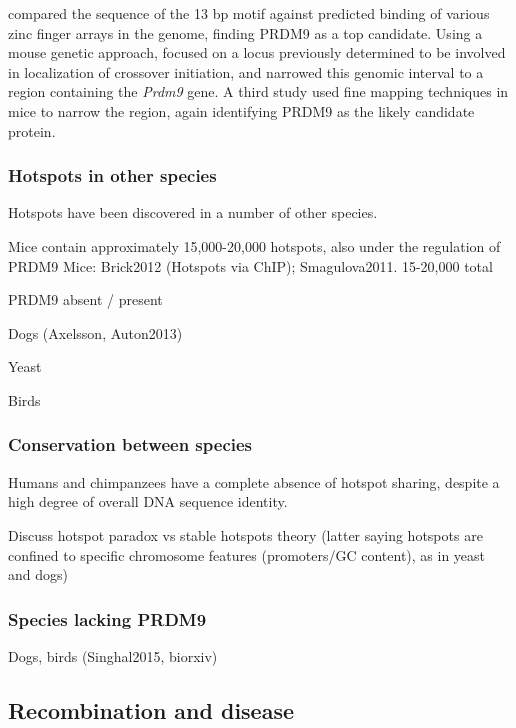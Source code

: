 \citet{Myers2010} compared the sequence of the 13 bp motif against predicted binding of various zinc finger arrays in the genome, finding PRDM9 as a top candidate.
Using a mouse genetic approach, \citet{Baudat2010} focused on a locus previously determined to be involved in localization of crossover initiation\cite{Grey2009,Parvanov2009},
and narrowed this genomic interval to a region containing the \textit{Prdm9} gene.
A third study used fine mapping techniques in mice to narrow the region, again identifying PRDM9 as the likely candidate protein\cite{Parvanov2010}.



\subsubsection{Hotspots in other species}

Hotspots have been discovered in a number of other species.

Mice contain approximately 15,000-20,000 hotspots, also under the regulation of PRDM9
Mice: Brick2012 (Hotspots via ChIP); Smagulova2011. 15-20,000 total

PRDM9 absent / present

Dogs (Axelsson, Auton2013)

Yeast

Birds


\subsubsection{Conservation between species}
Humans and chimpanzees have a complete absence of hotspot sharing, despite a high degree of overall DNA sequence identity\cite{Ptak2005,Winckler2005,Auton2012a}.

Discuss hotspot paradox vs stable hotspots theory (latter saying hotspots are confined to specific chromosome features (promoters/GC content), as in yeast and dogs)
\subsubsection{Species lacking PRDM9}
Dogs, birds (Singhal2015, biorxiv) 

\subsection{Recombination and disease}

